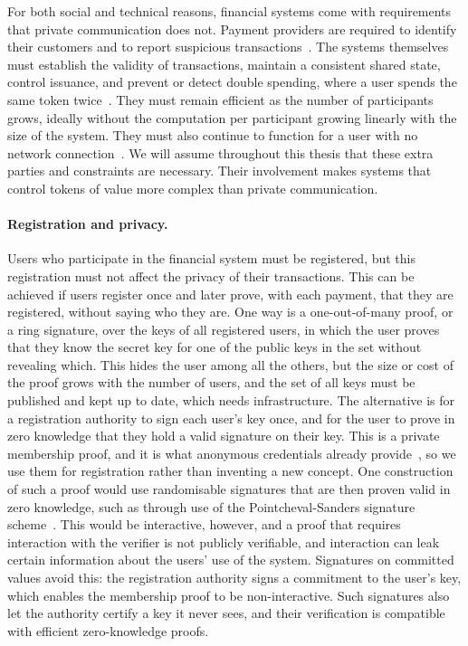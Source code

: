 For both social and technical reasons, financial systems come with requirements
that private communication does not. Payment providers are required to identify
their customers and to report suspicious
transactions~\cite{fatf2012recommendations}. The systems themselves must
establish the validity of transactions, maintain a consistent shared state,
control issuance, and prevent or detect double spending, where a user spends
the same token twice~\cite{C:Chaum82,C:ChaFiaNao88}. They must remain efficient
as the number of participants grows, ideally without the computation per
participant growing linearly with the size of the system. They must also
continue to function for a user with no network
connection~\cite{aboulaiz2024offline}. We will assume throughout this thesis
that these extra parties and constraints are necessary. Their involvement makes
systems that control tokens of value more complex than private communication.

\paragraph{Registration and privacy.} Users who participate in the
financial system must be registered, but this registration must not affect the
privacy of their transactions. This can be achieved if users register once and
later prove, with each payment, that they are registered, without saying who
they are.
One way is a one-out-of-many proof, or a ring signature, over the keys of all
registered users, in which the user proves that they know the secret key for one
of the public keys in the set without revealing which. This hides the user among
all the others, but the size or cost of the proof grows with the number of
users, and the set of all keys must be published and kept up to date, which
needs infrastructure. The alternative is for a registration authority to sign
each user's key once, and for the user to prove in zero knowledge that they
hold a valid signature on their key. This is a private membership proof, and it
is what anonymous credentials already provide~\cite{EC:Chaum85,EC:CamLys01}, so
we use them for registration rather than inventing a new concept. One
construction of such a proof would use randomisable signatures that are then
proven valid in zero knowledge, such as through use of the Pointcheval-Sanders
signature scheme~\cite{RSA:PoiSan16}. This would be interactive, however, and a
proof that requires interaction with the verifier is not publicly verifiable,
and interaction can leak certain information about the users' use of the
system. Signatures on committed values avoid this: the registration authority
signs a commitment to the user's key, which enables the membership proof to be
non-interactive. Such signatures also let the authority certify a key it never
sees, and their verification is compatible with efficient zero-knowledge
proofs.

